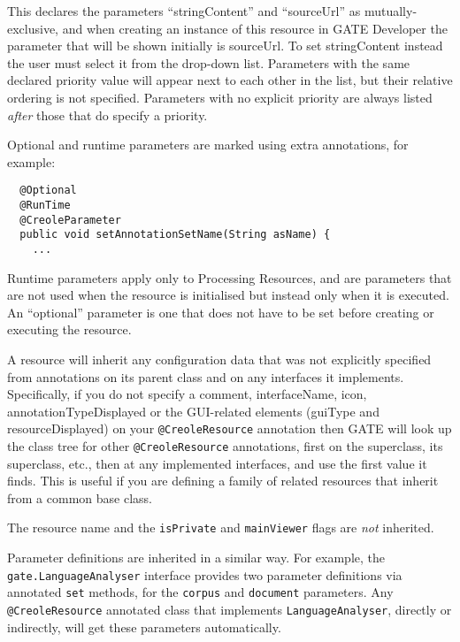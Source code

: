 This declares the parameters ``stringContent'' and ``sourceUrl'' as
mutually-exclusive, and when creating an instance of this resource in GATE
Developer the parameter that will be shown initially is sourceUrl.  To set
stringContent instead the user must select it from the drop-down list.
Parameters with the same declared priority value will appear next to each other
in the list, but their relative ordering is not specified.  Parameters with no
explicit priority are always listed {\it after} those that do specify a
priority.

Optional and runtime parameters are marked using extra annotations, for example:
\begin{lstlisting}
  @Optional
  @RunTime
  @CreoleParameter
  public void setAnnotationSetName(String asName) {
    ...
\end{lstlisting}

Runtime parameters apply only to Processing Resources, and are parameters that
are not used when the resource is initialised but instead only when it is
executed.  An ``optional'' parameter is one that does not have to be set
before creating or executing the resource.


A resource
will inherit any configuration data that was not explicitly specified
from annotations on its parent class and on any interfaces it
implements.  Specifically, if you do not specify a comment,
interfaceName, icon, annotationTypeDisplayed or the GUI-related
elements (guiType and resourceDisplayed) on
your \verb|@CreoleResource| annotation then GATE will look up the
class tree for other \verb|@CreoleResource| annotations, first on the
superclass, its superclass, etc., then at any implemented interfaces,
and use the first value it finds.  This is useful if you are defining
a family of related resources that inherit from a common base class.

The resource name and the {\tt isPrivate} and {\tt mainViewer} flags are
\emph{not} inherited.

Parameter definitions are inherited in a similar way.  For
example, the {\tt gate.LanguageAnalyser} interface provides two parameter
definitions via annotated {\tt set} methods, for the {\tt corpus} and
{\tt document} parameters.  Any \verb|@CreoleResource| annotated class that
implements {\tt LanguageAnalyser}, directly or indirectly, will get these
parameters automatically.


